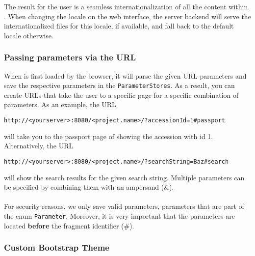 The result for the user is a seamless internationalization of all the content within {\germinate}. When changing the locale on the web interface, the server backend will serve the internationalized files for this locale, if available, and fall back to the default locale otherwise. 

\subsubsection{Passing parameters via the URL}
When {\germinate} is first loaded by the browser, it will parse the given URL parameters and save the respective parameters in the \texttt{ParameterStores}. As a result, you can create URLs that take the user to a specific page for a specific combination of parameters. As an example, the URL
\begin{center}
\texttt{http://<your\textunderscore server>:8080/<project.name>/?accessionId=1\#passport}
\end{center}
will take you to the passport page of {\germinate} showing the accession with id 1. Alternatively, the URL
\begin{center}
\texttt{http://<your\textunderscore server>:8080/<project.name>/?searchString=Baz\#search}
\end{center}
will show the search results for the given search string. Multiple parameters can be specified by combining them with an ampersand (\&).\\
\\
For security reasons, we only save valid parameters, \ie parameters that are part of the enum \texttt{Parameter}. Moreover, it is very important that the parameters are located \textbf{before} the fragment identifier (\#).


\subsubsection{Custom Bootstrap Theme}


